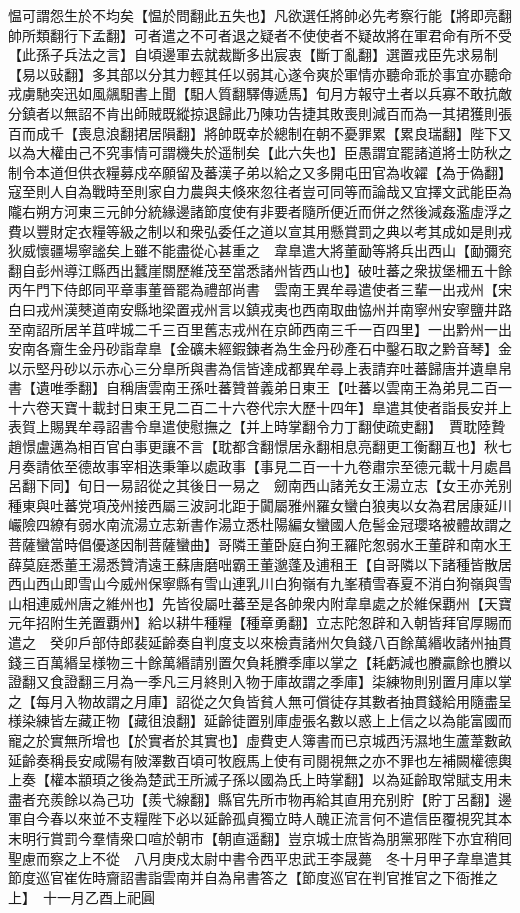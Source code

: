 愠可謂怨生於不均矣【愠於問翻此五失也】凡欲選任將帥必先考察行能【將即亮翻帥所類翻行下孟翻】可者遣之不可者退之疑者不使使者不疑故將在軍君命有所不受【此孫子兵法之言】自頃邊軍去就裁斷多出宸衷【斷丁亂翻】選置戎臣先求易制【易以䜴翻】多其部以分其力輕其任以弱其心遂令爽於軍情亦聽命乖於事宜亦聽命戎虜馳突迅如風飊馹書上聞【馹人質翻驛傳遞馬】旬月方報守土者以兵寡不敢抗敵分鎮者以無詔不肯出師賊既縱掠退歸此乃陳功告捷其敗喪則減百而為一其捃獲則張百而成千【喪息浪翻捃居隕翻】將帥既幸於總制在朝不憂罪累【累良瑞翻】陛下又以為大權由己不究事情可謂機失於遥制矣【此六失也】臣愚謂宜罷諸道將士防秋之制令本道但供衣糧募戍卒願留及蕃漢子弟以給之又多開屯田官為收糴【為于偽翻】寇至則人自為戰時至則家自力農與夫倏來忽往者豈可同等而論哉又宜擇文武能臣為隴右朔方河東三元帥分統緣邊諸節度使有非要者隨所便近而併之然後減姦濫虛浮之費以豐財定衣糧等級之制以和衆弘委任之道以宣其用懸賞罰之典以考其成如是則戎狄威懷疆場寧謐矣上雖不能盡從心甚重之　韋臯遣大將董勔等將兵出西山【勔彌兖翻自彭州導江縣西出蠶崖關歷維茂至當悉諸州皆西山也】破吐蕃之衆拔堡柵五十餘　丙午門下侍郎同平章事董晉罷為禮部尚書　雲南王異牟尋遣使者三輩一出戎州【宋白曰戎州漢僰道南安縣地梁置戎州言以鎮戎夷也西南取曲恊州并南寧州安寧鹽井路至南詔所居羊苴哶城二千三百里舊志戎州在京師西南三千一百四里】一出黔州一出安南各齎生金丹砂詣韋臯【金礦未經鍜鍊者為生金丹砂產石中鑿石取之黔音琴】金以示堅丹砂以示赤心三分臯所與書為信皆達成都異牟尋上表請弃吐蕃歸唐并遺臯帛書【遺唯季翻】自稱唐雲南王孫吐蕃贊普義弟日東王【吐蕃以雲南王為弟見二百一十六卷天寶十載封日東王見二百二十六卷代宗大歷十四年】臯遣其使者詣長安并上表賀上賜異牟尋詔書令臯遣使慰撫之【并上時掌翻令力丁翻使疏吏翻】　賈耽陸贄趙憬盧邁為相百官白事更讓不言【耽都含翻憬居永翻相息亮翻更工衡翻互也】秋七月奏請依至德故事宰相迭秉筆以處政事【事見二百一十九卷肅宗至德元載十月處昌呂翻下同】旬日一易詔從之其後日一易之　劒南西山諸羌女王湯立志【女王亦羌别種東與吐蕃党項茂州接西屬三波訶北距于闐屬雅州羅女蠻白狼夷以女為君居康延川巗險四繚有弱水南流湯立志新書作湯立悉杜陽編女蠻國人危髻金冠瓔珞被體故謂之菩薩蠻當時倡優遂因制菩薩蠻曲】哥隣王董卧庭白狗王羅陀怱弱水王董辟和南水王薛莫庭悉董王湯悉贊清遠王蘇唐磨咄霸王董邈蓬及逋租王【自哥隣以下諸種皆散居西山西山即雪山今威州保寧縣有雪山連乳川白狗嶺有九峯積雪春夏不消白狗嶺與雪山相連威州唐之維州也】先皆役屬吐蕃至是各帥衆内附韋臯處之於維保覇州【天寶元年招附生羌置覇州】給以耕牛種糧【種章勇翻】立志陀怱辟和入朝皆拜官厚賜而遣之　癸卯戶部侍郎裴延齡奏自判度支以來檢責諸州欠負錢八百餘萬緡收諸州抽貫錢三百萬緡呈様物三十餘萬緡請别置欠負耗賸季庫以掌之【耗虧減也賸贏餘也賸以證翻又食證翻三月為一季凡三月終則入物于庫故謂之季庫】柒練物則别置月庫以掌之【每月入物故謂之月庫】詔從之欠負皆貧人無可償徒存其數者抽貫錢給用隨盡呈様染練皆左藏正物【藏徂浪翻】延齡徒置别庫虛張名數以惑上上信之以為能富國而寵之於實無所增也【於實者於其實也】虛費吏人簿書而已京城西汚濕地生蘆葦數畝延齡奏稱長安咸陽有陂澤數百頃可牧廐馬上使有司閱視無之亦不罪也左補闕權德輿上奏【權本顓頊之後為楚武王所滅子孫以國為氏上時掌翻】以為延齡取常賦支用未盡者充羨餘以為己功【羨弋線翻】縣官先所市物再給其直用充别貯【貯丁呂翻】邊軍自今春以來並不支糧陛下必以延齡孤貞獨立時人醜正流言何不遣信臣覆視究其本末明行賞罰今羣情衆口喧於朝市【朝直遥翻】豈京城士庶皆為朋黨邪陛下亦宜稍囘聖慮而察之上不從　八月庚戍太尉中書令西平忠武王李晟薨　冬十月甲子韋臯遣其節度巡官崔佐時齎詔書詣雲南并自為帛書答之【節度巡官在判官推官之下衙推之上】　十一月乙酉上祀圓